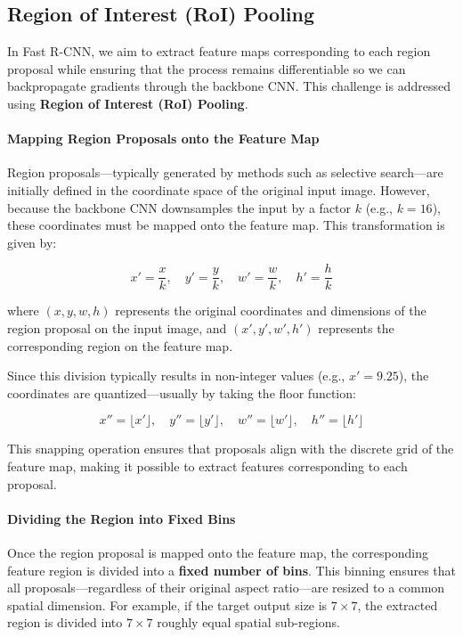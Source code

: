 \subsection{Region of Interest (RoI) Pooling}
\label{subsec:chapter14_roi_pooling}

In Fast R-CNN, we aim to extract feature maps corresponding to each region proposal while ensuring that the process remains differentiable so we can backpropagate gradients through the backbone CNN. This challenge is addressed using \textbf{Region of Interest (RoI) Pooling}.

\paragraph{Mapping Region Proposals onto the Feature Map}
Region proposals—typically generated by methods such as selective search—are initially defined in the coordinate space of the original input image. However, because the backbone CNN downsamples the input by a factor \( k \) (e.g., \( k = 16 \)), these coordinates must be mapped onto the feature map. This transformation is given by:

\[
x' = \frac{x}{k}, \quad y' = \frac{y}{k}, \quad w' = \frac{w}{k}, \quad h' = \frac{h}{k}
\]

where \( (x, y, w, h) \) represents the original coordinates and dimensions of the region proposal on the input image, and \( (x', y', w', h') \) represents the corresponding region on the feature map.

Since this division typically results in non-integer values (e.g., \( x' = 9.25 \)), the coordinates are quantized—usually by taking the floor function:

\[
x'' = \lfloor x' \rfloor, \quad y'' = \lfloor y' \rfloor, \quad w'' = \lfloor w' \rfloor, \quad h'' = \lfloor h' \rfloor
\]

This snapping operation ensures that proposals align with the discrete grid of the feature map, making it possible to extract features corresponding to each proposal.

\paragraph{Dividing the Region into Fixed Bins}
Once the region proposal is mapped onto the feature map, the corresponding feature region is divided into a \textbf{fixed number of bins}. This binning ensures that all proposals—regardless of their original aspect ratio—are resized to a common spatial dimension. For example, if the target output size is \( 7 \times 7 \), the extracted region is divided into \( 7 \times 7 \) roughly equal spatial sub-regions.

